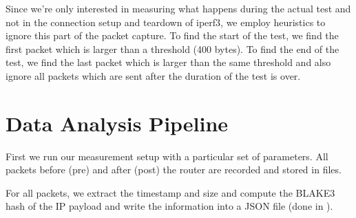 Since we're only interested in measuring what happens during the actual test and not in the connection setup and teardown of iperf3, we employ heuristics to ignore this part of the packet capture.
To find the start of the test, we find the first packet which is larger than a threshold (400 bytes).
To find the end of the test, we find the last packet which is larger than the same threshold and also ignore all packets which are sent after the duration of the test is over.


\section{Data Analysis Pipeline}
\label{sect:data-analysis-pipeline}
First we run our measurement setup with a particular set of parameters.
All packets before (pre) and after (post) the router are recorded and stored in  files.

For all packets, we extract the timestamp and size and compute the BLAKE3 \cite{BLAKE3} hash of the IP payload and write the information into a JSON \cite{RFC8259} file (done in \mbox{}).

